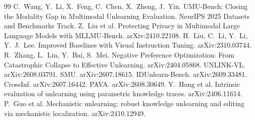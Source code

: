 \documentclass[11pt]{article}
\begin{document}
\begin{thebibliography}{99}\small
{} C.~Wang, Y.~Li, X.~Feng, C.~Chen, X.~Zheng, J.~Yin.
  UMU-Bench: Closing the Modality Gap in Multimodal Unlearning Evaluation. NeurIPS 2025 Datasets and Benchmarks Track.
 Z.~Liu et al. Protecting Privacy in Multimodal Large Language Models with MLLMU-Bench.
  arXiv:2410.22108. %
 H.~Liu, C.~Li, Y.~Li, Y.~J.~Lee. Improved Baselines with Visual Instruction Tuning. arXiv:2310.03744.
 R.~Zhang, L.~Lin, Y.~Bai, S.~Mei. Negative Preference Optimization: From Catastrophic Collapse to
  Effective Unlearning. arXiv:2404.05868.
 UNLINK-VL. arXiv:2608.03791. %
 SMU. arXiv:2607.18615. %
 IDUnlearn-Bench. arXiv:2609.33481. %
 CrossInf. arXiv:2607.16442. %
 PAVA. arXiv:2608.30649. %
 Y.~Hong et al. Intrinsic evaluation of unlearning using parametric knowledge traces.
  arXiv:2406.11614. %
 P.~Guo et al. Mechanistic unlearning: robust knowledge unlearning and editing via mechanistic
  localization. arXiv:2410.12949. %
\end{thebibliography}
\end{document}

